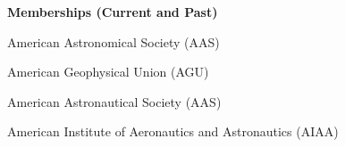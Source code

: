\documentclass[margin,line]{res}
\newlength{\myitemspacing}
\newenvironment{list_new}{
    \begin{list}{\scriptsize{$\bullet$}}{%
        \setlength{\itemsep}{0in}
        \setlength{\parsep}{\myitemspacing} \setlength{\parskip}{0in}
        \setlength{\topsep}{0in} \setlength{\partopsep}{0in} 
        \setlength{\leftmargin}{0.2in}
        }}
    {\end{list}
}
\newif\ifallpubs
\begin{document}
\begin{resume}
{\bf Memberships (Current and Past)}
\begin{list_new}
    \item American Astronomical Society (AAS)
    \item American Geophysical Union (AGU)
    \item American Astronautical Society (AAS)
    \item American Institute of Aeronautics and Astronautics (AIAA)
\end{list_new}

\begin{refsection}
\nocite{*}
\ifallpubs
\section{\sc Journal Articles}
\vspace{0.15in}
\printbibliography[heading=none]
\else
\fi
\end{refsection}

\begin{refsection}
\nocite{*}
\ifallpubs
\section{\sc Conference and Meeting Proceedings}
\vspace{0.15in}
\printbibliography[heading=none]
\else
\fi
\end{refsection}

\begin{refsection}
\nocite{*}
\ifallpubs
\section{\sc Invited Seminars and Public Talks}
\vspace{0.15in}
\printbibliography[heading=none]
\else
\fi
\end{refsection}

\end{resume}
\thispagestyle{lastpage}
\end{document}
